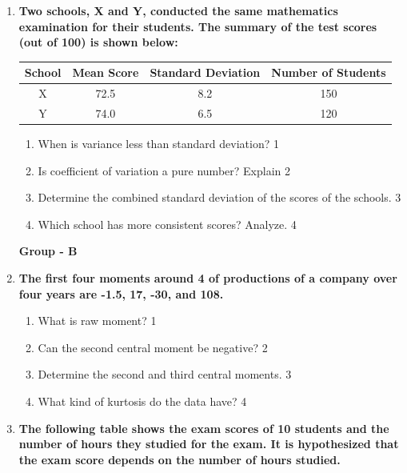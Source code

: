 \documentclass[12pt]{article}
\begin{document}
\begin{enumerate}
   \item 
  \textbf{Two schools, X and Y, conducted the same mathematics examination for their students. The summary of the test scores (out of 100) is shown below:}

\begin{table}[h]
\centering
\begin{tabular}{c|ccc}
School & Mean Score & Standard Deviation & Number of Students \\ \hline
X      & 72.5       & 8.2                & 150                \\ 
Y      & 74.0       & 6.5                & 120               
\end{tabular}
\end{table}

  \begin{enumerate}
      \item When is variance less than standard deviation? \hfill 1
      \item Is coefficient of variation a pure number? Explain \hfill 2
    \item  
	Determine the combined standard deviation of the scores of the schools. \hfill 3
    \item
	Which school has more consistent scores? Analyze. \hfill 4
  \end{enumerate}

  \begin{center}
\textbf{Group  - B}
\end{center}


  
   \item
	  \textbf{The first four moments around 4 of productions of a company over four years are -1.5, 17, -30, and 108.} 
  
  \begin{enumerate}
  \item  What is raw moment? \hfill 1
    \item
	Can the second central moment be negative? \hfill 2
    \item  
	Determine the second and third central moments. \hfill 3
    \item
	What kind of kurtosis do the data have? \hfill 4
  \end{enumerate}

   \item
	  \textbf{The following table shows the exam scores of 10 students and the number of hours they studied for the exam. It is hypothesized that the exam score depends on the number of hours studied.} 
	  

\end{enumerate}
\end{document}
